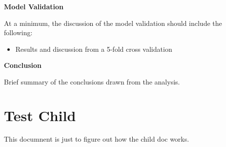 \documentclass[]{book}
\providecommand{\tightlist}{%
  \setlength{\itemsep}{0pt}\setlength{\parskip}{0pt}}
\begin{document}
\textbf{Model Validation}

At a minimum, the discussion of the model validation should include the
following:

\begin{itemize}
\tightlist
\item
  Results and discussion from a 5-fold cross validation
\end{itemize}

\textbf{Conclusion}

Brief summary of the conclusions drawn from the analysis.

\chapter{Test Child}\label{test-child-1}

This documnent is just to figure out how the child doc works.


\end{document}
